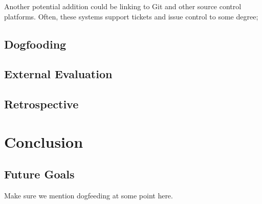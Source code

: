 \documentclass[a4paper]{l3proj}
\begin{document}
  Another potential addition could be linking to Git and other source control platforms. Often, these systems support tickets and issue control to some degree; 

  \section{Dogfooding}
  \label{dogfooding}


  \section{External Evaluation}
  \label{externalEvaluation}


  \section{Retrospective}
  \label{retrospective}


  \chapter{Conclusion}
  \label{conclusion}


  \section{Future Goals}
  \label{futureGoals}

  Make sure we mention dogfeeding at some point here.

  
\end{document}

